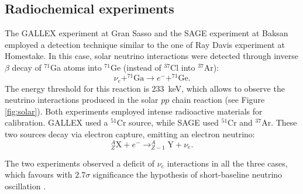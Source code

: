 \subsection{Radiochemical experiments}
    The GALLEX experiment at Gran Sasso and the SAGE experiment at Baksan employed a detection technique similar to the one of Ray Davis experiment at Homestake. In this case, solar neutrino interactions were detected through inverse $\beta$ decay of $^{71}$Ga atoms into $^{71}$Ge (instead of $^{37}$Cl into $^{37}$Ar):
\begin{equation}
    \nu_e + ^{71}\mathrm{Ga} \rightarrow e^- + ^{71}\mathrm{Ge}.
\end{equation}
The energy threshold for this reaction is 233~keV, which allows to observe the neutrino interactions produced in the solar $pp$ chain reaction (see Figure \ref{fig:solar}). Both experiments employed intense radioactive materials for calibration. GALLEX used a $^{51}$Cr source, while SAGE used $^{51}$Cr and $^{37}$Ar. These two sources decay via electron capture, emitting an electron neutrino:
\begin{equation} 
    ^{A}_{Z}\mathrm{X} + e^{-} \rightarrow ^{A}_{Z-1}\mathrm{Y} + \nu_{e}.
\end{equation}

The two experiments observed a deficit of $\nu_{e}$ interactions in all the three cases, which favours with $2.7\sigma$ significance the hypothesis of short-baseline neutrino oscillation \cite{Giunti:2010zu}.

